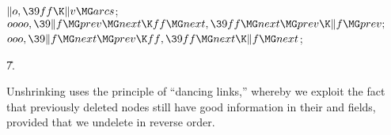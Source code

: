 \2\6
${}\|o,\39\\{ff}\K\|v\MG\\{arcs}{}$;\6
${}\\{oooo},\39\|f\MG\\{prev}\MG\\{next}\K\\{ff}\MG\\{next},\39\\{ff}\MG%
\\{next}\MG\\{prev}\K\|f\MG\\{prev};{}$\6
${}\\{ooo},\39\|f\MG\\{next}\MG\\{prev}\K\\{ff},\39\\{ff}\MG\\{next}\K\|f\MG%
\\{next}{}$;\par
\U7.\fi

Unshrinking uses the principle of ``dancing links,''
whereby we exploit
the fact that previously deleted nodes still have good information in
their  and  fields, provided that we undelete in
reverse order.

